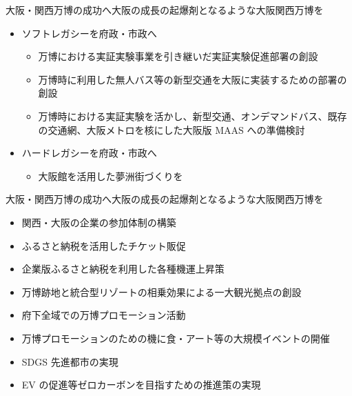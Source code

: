 \documentclass[dvipdfmx]{beamer}
\begin{document}
    \begin{frame}{大阪・関西万博の成功へ}{大阪の成長の起爆剤となるような大阪関西万博を}
        \begin{small}
            \begin{itemize}
                \setlength{\itemsep}{5mm}
                \item ソフトレガシーを府政・市政へ
                \begin{itemize}
                    \setlength{\itemsep}{2mm}
                    \item 万博における実証実験事業を引き継いだ実証実験促進部署の創設
                    \item 万博時に利用した無人バス等の新型交通を大阪に実装するための部署の創設
                    \item 万博時における実証実験を活かし、新型交通、オンデマンドバス、既存の交通網、大阪メトロを核にした大阪版 MAAS への準備検討                    
                \end{itemize}
                \item ハードレガシーを府政・市政へ
                \begin{itemize}
                    \setlength{\itemsep}{2mm}
                    \item 大阪館を活用した夢洲街づくりを
                \end{itemize}
            \end{itemize}
        \end{small}
    \end{frame}

    \begin{frame}{大阪・関西万博の成功へ}{大阪の成長の起爆剤となるような大阪関西万博を}
        \begin{small}
            \begin{itemize}
                \setlength{\itemsep}{2mm}
                \item 関西・大阪の企業の参加体制の構築
                \item ふるさと納税を活用したチケット販促
                \item 企業版ふるさと納税を利用した各種機運上昇策
                \item 万博跡地と統合型リゾートの相乗効果による一大観光拠点の創設
                \item 府下全域での万博プロモーション活動
                \item 万博プロモーションのための機に食・アート等の大規模イベントの開催
                \item SDGS 先進都市の実現
                \item EV の促進等ゼロカーボンを目指すための推進策の実現
            \end{itemize}
        \end{small}
    \end{frame}
\end{document}
